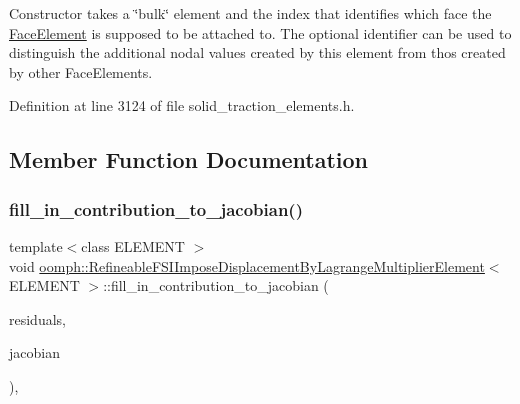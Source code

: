 Constructor takes a \char`\"{}bulk\char`\"{} element and the index that identifies which face the \hyperlink{classoomph_1_1FaceElement}{Face\+Element} is supposed to be attached to. The optional identifier can be used to distinguish the additional nodal values created by this element from thos created by other Face\+Elements. 



Definition at line 3124 of file solid\+\_\+traction\+\_\+elements.\+h.



\subsection{Member Function Documentation}
\mbox{\label{classoomph_1_1RefineableFSIImposeDisplacementByLagrangeMultiplierElement_a3c86bf6884cd7cfdfa8e7381fbd16fcf}} 
\subsubsection{\texorpdfstring{fill\+\_\+in\+\_\+contribution\+\_\+to\+\_\+jacobian()}{fill\_in\_contribution\_to\_jacobian()}}
{\footnotesize\ttfamily template$<$class E\+L\+E\+M\+E\+NT $>$ \\
void \hyperlink{classoomph_1_1RefineableFSIImposeDisplacementByLagrangeMultiplierElement}{oomph\+::\+Refineable\+F\+S\+I\+Impose\+Displacement\+By\+Lagrange\+Multiplier\+Element}$<$ E\+L\+E\+M\+E\+NT $>$\+::fill\+\_\+in\+\_\+contribution\+\_\+to\+\_\+jacobian (\begin{DoxyParamCaption}\item[{\hyperlink{classoomph_1_1Vector}{Vector}$<$ double $>$ \&}]{residuals,  }\item[{\hyperlink{classoomph_1_1DenseMatrix}{Dense\+Matrix}$<$ double $>$ \&}]{jacobian }\end{DoxyParamCaption})\hspace{0.3cm}{\ttfamily [inline]}, {\ttfamily [virtual]}}




